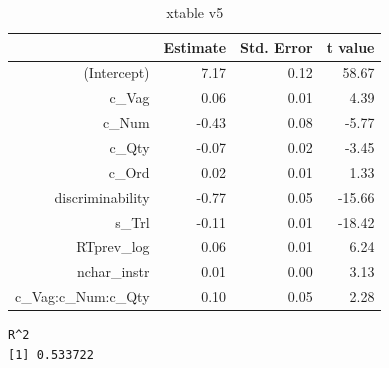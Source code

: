 \documentclass[a4paper,12pt,twoside]{article}\usepackage[]{graphicx}\usepackage[]{color}
\makeatletter
\newenvironment{kframe}{%
 \def\at@end@of@kframe{}%
 \ifinner\ifhmode%
  \def\at@end@of@kframe{\end{minipage}}%
  \begin{minipage}{\columnwidth}%
 \fi\fi%
 \def\FrameCommand##1{\hskip\@totalleftmargin \hskip-\fboxsep
 \colorbox{shadecolor}{##1}\hskip-\fboxsep
     \hskip-\linewidth \hskip-\@totalleftmargin \hskip\columnwidth}%
 \MakeFramed {\advance\hsize-\width
   \@totalleftmargin\z@ \linewidth\hsize
   \@setminipage}}%
 {\par\unskip\endMakeFramed%
 \at@end@of@kframe}
\newenvironment{knitrout}{}{} %
\makeatother
\begin{document}
\clearpage

\begin{table}[htbp]
\centering
\begingroup\small
\begin{tabular}{rrrr}
  \hline
 & Estimate & Std. Error & t value \\ 
  \hline
(Intercept) & 7.17 & 0.12 & 58.67 \\ 
  c\_Vag & 0.06 & 0.01 & 4.39 \\ 
  c\_Num & -0.43 & 0.08 & -5.77 \\ 
  c\_Qty & -0.07 & 0.02 & -3.45 \\ 
  c\_Ord & 0.02 & 0.01 & 1.33 \\ 
  discriminability & -0.77 & 0.05 & -15.66 \\ 
  s\_Trl & -0.11 & 0.01 & -18.42 \\ 
  RTprev\_log & 0.06 & 0.01 & 6.24 \\ 
  nchar\_instr & 0.01 & 0.00 & 3.13 \\ 
  c\_Vag:c\_Num:c\_Qty & 0.10 & 0.05 & 2.28 \\ 
   \hline
\end{tabular}
\endgroup
\caption{xtable v5} 
\end{table}


\begin{knitrout}\scriptsize
{}\color{fgcolor}\begin{kframe}
\begin{verbatim}
R^2
[1] 0.533722
\end{verbatim}
\end{kframe}
\end{knitrout}

\end{document}

